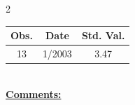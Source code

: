 
\bigskip 
\begin{multicols}{2}{ 
\begin{tabular}{ccc}
\hline  Obs.  &  Date &  Std. Val. \\ 
\hline 
                       13 &        1/2003 &          3.47 \vspace{-.12in} \\  
 \end{tabular} 
\\ 
 \columnbreak 
 \singlespacing 
 \underline{\textbf{Comments:}} \\ 
 \bigskip       

 } 
\end{multicols} 

